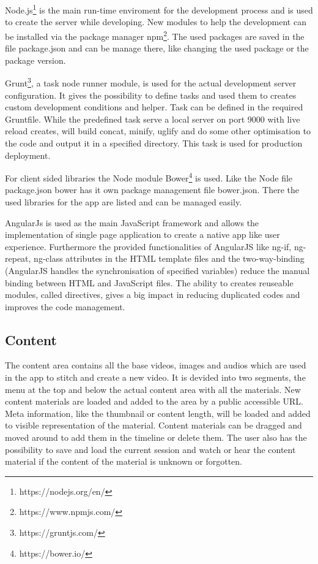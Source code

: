 \documentclass[conference]{IEEEtran}
\begin{document}
Node.js\footnote{https://nodejs.org/en/} is the main run-time enviroment for the development process and is used to create the server while developing. New modules to help the development can be installed via the package manager npm\footnote{https://www.npmjs.com/}. The used packages are saved in the file package.json and can be manage there, like changing the used package or the package version.

Grunt\footnote{https://gruntjs.com/}, a task node runner module, is used for the actual development server configuration. It gives the possibility to define tasks and used them to creates custom development conditions and helper. Task can be defined in the required Gruntfile. While the predefined task serve a local server on port 9000 with live reload creates, will build concat, minify, uglify and do some other optimisation to the code and output it in a specified directory. This task is used for production deployment.

For client sided libraries the Node module Bower\footnote{https://bower.io/} is used. Like the Node file package.json bower has it own package management file bower.json. There the used libraries for the app are listed and can be managed easily. 

AngularJs is used as the main JavaScript framework and allows the implementation of single page application to create a native app like user experience. Furthermore the provided functionalities of AngularJS like ng-if, ng-repeat, ng-class attributes in the HTML template files and the two-way-binding (AngularJS handles the synchronisation of specified variables) reduce the manual binding between HTML and JavaScript files. The ability to creates reuseable modules, called directives, gives a big impact in reducing duplicated codes and improves the code management.

\subsection{Content}
The content area contains all the base videos, images and audios which are used in the app to stitch and create a new video. It is devided into two segments, the menu at the top and below the actual content area with all the materials. New content materials are loaded and added to the area by a public accessible URL. Meta information, like the thumbnail or content length, will be loaded and added to visible representation of the material. Content materials can be dragged and moved around to add them in the timeline or delete them. The user also has the possibility to save and load the current session and watch or hear the content material if the content of the material is unknown or forgotten.
\end{document}
